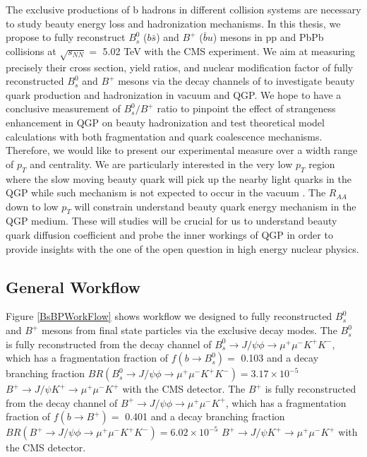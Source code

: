 The exclusive productions of b hadrons in different collision systems are necessary to study beauty energy loss and hadronization mechanisms. In this thesis, we propose to fully reconstruct $B^0_s$ ($b\bar s$) and $B^+$ ($\bar b u$) mesons in pp and PbPb collisions at $\sqrt{s_{NN}} = $ 5.02 TeV with the CMS experiment. We aim at measuring precisely their cross section, yield ratios, and nuclear modification factor of fully reconstructed $B^0_s$ and $B^+$ mesons via the decay channels of  to investigate beauty quark production and hadronization in vacuum and QGP. We hope to have a conclusive measurement of $B^0_s/B^+$ ratio to pinpoint the effect of strangeness enhancement in QGP on beauty hadronization and test theoretical model calculations \cite{StrangetoLight} with both fragmentation \cite{} and quark coalescence \cite{} mechanisms. Therefore, we would like to present our experimental measure over a width range of $p_T$ and centrality. We are particularly interested in the very low $p_T$ region where the slow moving beauty quark will pick up the nearby light quarks in the QGP while such mechanism is not expected to occur in the vacuum \cite{}. The $R_{AA}$ down to low $p_T$ will constrain understand beauty quark energy mechanism in the QGP medium. These will studies will be crucial for us to understand beauty quark diffusion coefficient and probe the inner workings of QGP in order to provide insights with the one of the open question in high energy nuclear physics. 

\subsection{General Workflow}

Figure \ref{BsBPWorkFlow} shows workflow we designed to fully reconstructed $B^0_s$ and $B^+$ mesons from final state particles via the exclusive decay modes. The $B^0_s$ is fully reconstructed from the decay channel of $B^0_s \rightarrow J/\psi \phi \rightarrow \mu^+\mu^- K^+K^-$, which has a fragmentation fraction of $f(b\rightarrow B_s^0) =$ 0.103 and a decay branching fraction $BR(B^0_s \rightarrow J/\psi \phi \rightarrow \mu^+\mu^- K^+K^-) = 3.17 \times 10^{-5}$ $B^+ \rightarrow J/\psi K^+\rightarrow \mu^+\mu^- K^+$ with the CMS detector. The $B^+$ is fully reconstructed from the decay channel of $B^+ \rightarrow J/\psi \phi \rightarrow \mu^+\mu^- K^+$, which has a fragmentation fraction of $f(b\rightarrow B^+) =$ 0.401 and a decay branching fraction $BR(B^+ \rightarrow J/\psi \phi \rightarrow \mu^+\mu^- K^+K^-) = 6.02 \times 10^{-5}$ $B^+ \rightarrow J/\psi K^+\rightarrow \mu^+\mu^- K^+$ with the CMS detector. 



